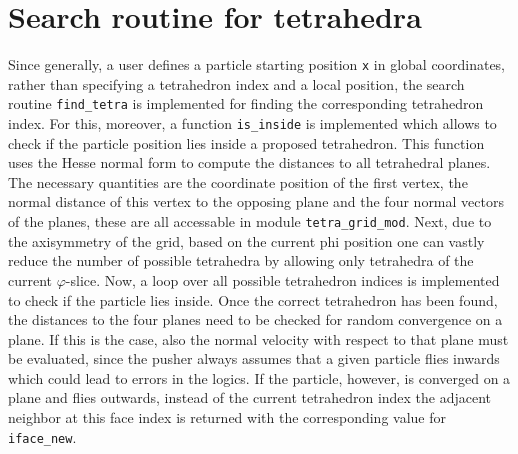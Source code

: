 \documentclass[./main.tex]{subfiles}
\begin{document}
\section{Search routine for tetrahedra}
Since generally, a user defines a particle starting position \texttt{x} in global coordinates, rather than specifying a tetrahedron index and a local position, the search routine \texttt{find\_tetra} is implemented for finding the corresponding tetrahedron index. For this, moreover, a function \texttt{is\_inside} is implemented which allows to check if the particle position lies inside a proposed tetrahedron. This function uses the Hesse normal form to compute the distances to all tetrahedral planes. The necessary quantities are the coordinate position of the first vertex, the normal distance of this vertex to the opposing plane and the four normal vectors of the planes, these are all accessable in module \texttt{tetra\_grid\_mod}. Next, due to the axisymmetry of the grid, based on the current phi position one can vastly reduce the number of possible tetrahedra by allowing only tetrahedra of the current $\varphi$-slice. Now, a loop over all possible tetrahedron indices is implemented to check if the particle lies inside. Once the correct tetrahedron has been found, the distances to the four planes need to be checked for random convergence on a plane. If this is the case, also the normal velocity with respect to that plane must be evaluated, since the pusher always assumes that a given particle flies inwards which could lead to errors in the logics. If the particle, however, is converged on a plane and flies outwards, instead of the current tetrahedron index the adjacent neighbor at this face index is returned with the corresponding value for \texttt{iface\_new}. 
\end{document}
